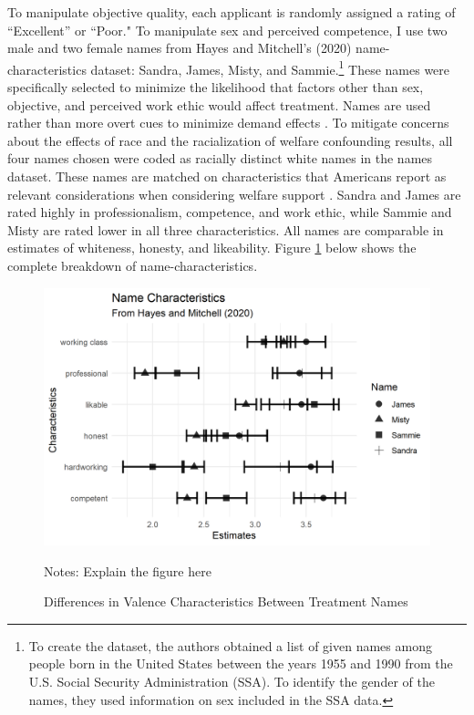 \documentclass[12pt]{article}%
\begin{document}
\begin{doublespace}
To manipulate objective quality, each applicant is randomly assigned a rating of ``Excellent” or ``Poor." To manipulate sex and perceived competence, I use two male and two female names from Hayes and Mitchell’s (2020) name-characteristics dataset: Sandra, James, Misty, and Sammie.\footnote{To create the dataset, the authors obtained a list of given names among people born in the United States between the years 1955 and 1990 from the U.S. Social Security Administration (SSA). To identify the gender of the names, they used information on sex included in the SSA data.} These names were specifically selected to minimize the likelihood that factors other than sex, objective, and perceived work ethic would affect treatment. Names are used rather than more overt cues to minimize demand effects \citep{quidt_experimenter_2019}. To mitigate concerns about the effects of race and the racialization of welfare confounding results, all four names chosen were coded as racially distinct white names in the \cite{hayes_2020} names dataset. These names are matched on characteristics that Americans report as relevant considerations when considering welfare support \citep{bobocel_justice-based_1998, katz_racial_1988, sniderman_symbolic_1986, sniderman_beyond_1996, mclosky_ethos}. Sandra and James are rated highly in professionalism, competence, and work ethic, while Sammie and Misty are rated lower in all three characteristics. All names are comparable in estimates of whiteness, honesty, and likeability. Figure \ref{characteristics} below shows the complete breakdown of name-characteristics.

\begin{figure}[h!]
	\centering
	\includegraphics[scale=1]{figs/characteristics.png}
	{\singlespacing
		\parbox{0.78\textwidth}{\scriptsize%
			Notes: Explain the figure here
	}}
	\caption{Differences in Valence Characteristics Between Treatment Names}
	\label{characteristics}
\end{figure}



\end{doublespace}
\end{document}
